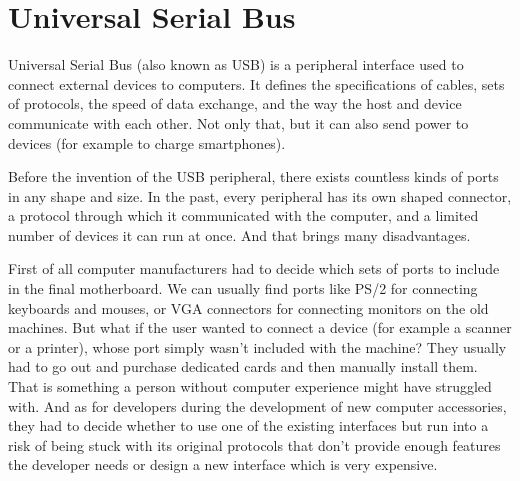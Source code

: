 


\chapter{Universal Serial Bus}
\label{usb}
Universal Serial Bus (also known as USB) is a peripheral interface used to connect external devices to computers. It defines the specifications of cables, sets of protocols, the speed of data exchange, and the way the host and device communicate with each other. Not only that, but it can also send power to devices (for example to charge smartphones). 

Before the invention of the USB peripheral, there exists countless kinds of ports in any shape and size. In the past, every peripheral has its own shaped connector, a protocol through which it communicated with the computer, and a limited number of devices it can run at once. And that brings many disadvantages. 

First of all computer manufacturers had to decide which sets of ports to include in the final motherboard. We can usually find ports like PS/2 for connecting keyboards and mouses, or VGA connectors for connecting monitors on the old machines. But what if the user wanted to connect a device (for example a scanner or a printer), whose port simply wasn't included with the machine? They usually had to go out and purchase dedicated cards and then manually install them. That is something a person without computer experience might have struggled with. And as for developers during the development of new computer accessories, they had to decide whether to use one of the existing interfaces but run into a risk of being stuck with its original protocols that don't provide enough features the developer needs or design a new interface which is very expensive.

